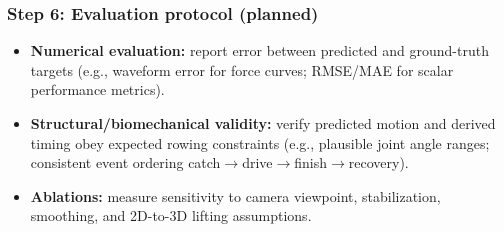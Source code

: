 \documentclass[11pt]{article}
\begin{document}
\subsubsection*{Step 6: Evaluation protocol (planned)}
\begin{itemize}
  \item \textbf{Numerical evaluation:} report error between predicted and ground-truth targets (e.g., waveform error for force curves; RMSE/MAE for scalar performance metrics).
  \item \textbf{Structural/biomechanical validity:} verify predicted motion and derived timing obey expected rowing constraints (e.g., plausible joint angle ranges; consistent event ordering catch$\rightarrow$drive$\rightarrow$finish$\rightarrow$recovery).
  \item \textbf{Ablations:} measure sensitivity to camera viewpoint, stabilization, smoothing, and 2D-to-3D lifting assumptions.
\end{itemize}
\end{document}
